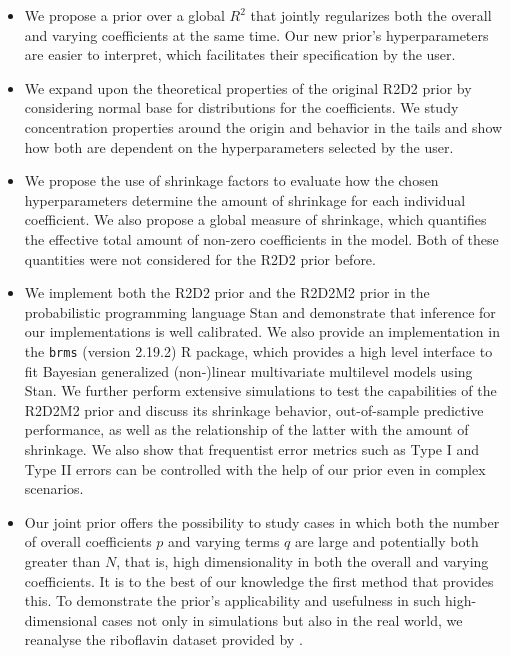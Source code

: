 \begin{itemize}
    \item We propose a prior over a global $R^2$ that jointly regularizes both the overall and varying coefficients at the same time. Our new prior's hyperparameters are easier to interpret, which facilitates their specification by the user.
    \item We expand upon the theoretical properties of the original R2D2 prior by considering normal base for distributions for the coefficients. We study concentration properties around the origin and behavior in the tails and show how both are dependent on the hyperparameters selected by the user.
    \item We propose the use of shrinkage factors to evaluate how the chosen hyperparameters determine the amount of shrinkage for each individual coefficient. We also propose a global measure of shrinkage, which quantifies the effective total amount of non-zero coefficients in the model. Both of these quantities were not considered for the R2D2 prior before.
    \item We implement both the R2D2 prior and the R2D2M2 prior in the probabilistic programming language Stan \citep{stan2022,StanJSS} and demonstrate that inference for our implementations is well calibrated. We also provide an implementation in the \texttt{brms} (version 2.19.2) \citep{brmsJSS} R package, which provides a high level interface to fit Bayesian generalized (non-)linear multivariate multilevel models using Stan. We further perform extensive simulations to test the capabilities of the R2D2M2 prior and discuss its shrinkage behavior, out-of-sample predictive performance, as well as the relationship of the latter with the amount of shrinkage. We also show that frequentist error metrics such as Type I and Type II errors can be controlled with the help of our prior even in complex scenarios.
    \item Our joint prior offers the possibility to study cases in which both the number of overall coefficients $p$ and varying terms $q$ are large and potentially both greater than $N$, that is, high dimensionality in both the overall and varying coefficients. It is to the best of our knowledge the first method that provides this. To demonstrate the prior's applicability and usefulness in such high-dimensional cases not only in simulations but also in the real world, we reanalyse the riboflavin dataset provided by \cite{BuehlmannBio}.

\end{itemize}


